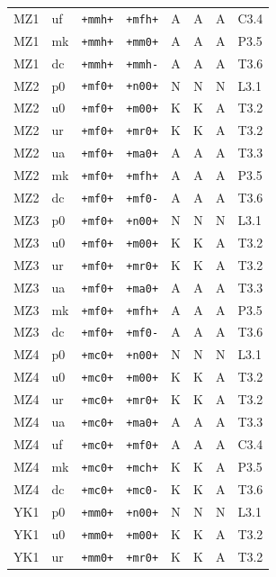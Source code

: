 {\begin{longtable}{@{}llllcccl@{}}
MZ1 & uf & \texttt{+mmh+} & \texttt{+mfh+} & A & A & A & C3.4 \\
MZ1 & mk & \texttt{+mmh+} & \texttt{+mm0+} & A & A & A & P3.5 \\
MZ1 & dc & \texttt{+mmh+} & \texttt{+mmh-} & A & A & A & T3.6 \\
MZ2 & p0 & \texttt{+mf0+} & \texttt{+n00+} & N & N & N & L3.1 \\
MZ2 & u0 & \texttt{+mf0+} & \texttt{+m00+} & K & K & A & T3.2 \\
MZ2 & ur & \texttt{+mf0+} & \texttt{+mr0+} & K & K & A & T3.2 \\
MZ2 & ua & \texttt{+mf0+} & \texttt{+ma0+} & A & A & A & T3.3 \\
MZ2 & mk & \texttt{+mf0+} & \texttt{+mfh+} & A & A & A & P3.5 \\
MZ2 & dc & \texttt{+mf0+} & \texttt{+mf0-} & A & A & A & T3.6 \\
MZ3 & p0 & \texttt{+mf0+} & \texttt{+n00+} & N & N & N & L3.1 \\
MZ3 & u0 & \texttt{+mf0+} & \texttt{+m00+} & K & K & A & T3.2 \\
MZ3 & ur & \texttt{+mf0+} & \texttt{+mr0+} & K & K & A & T3.2 \\
MZ3 & ua & \texttt{+mf0+} & \texttt{+ma0+} & A & A & A & T3.3 \\
MZ3 & mk & \texttt{+mf0+} & \texttt{+mfh+} & A & A & A & P3.5 \\
MZ3 & dc & \texttt{+mf0+} & \texttt{+mf0-} & A & A & A & T3.6 \\
MZ4 & p0 & \texttt{+mc0+} & \texttt{+n00+} & N & N & N & L3.1 \\
MZ4 & u0 & \texttt{+mc0+} & \texttt{+m00+} & K & K & A & T3.2 \\
MZ4 & ur & \texttt{+mc0+} & \texttt{+mr0+} & K & K & A & T3.2 \\
MZ4 & ua & \texttt{+mc0+} & \texttt{+ma0+} & A & A & A & T3.3 \\
MZ4 & uf & \texttt{+mc0+} & \texttt{+mf0+} & A & A & A & C3.4 \\
MZ4 & mk & \texttt{+mc0+} & \texttt{+mch+} & K & K & A & P3.5 \\
MZ4 & dc & \texttt{+mc0+} & \texttt{+mc0-} & K & K & A & T3.6 \\
YK1 & p0 & \texttt{+mm0+} & \texttt{+n00+} & N & N & N & L3.1 \\
YK1 & u0 & \texttt{+mm0+} & \texttt{+m00+} & K & K & A & T3.2 \\
YK1 & ur & \texttt{+mm0+} & \texttt{+mr0+} & K & K & A & T3.2 \\

\end{longtable}}
